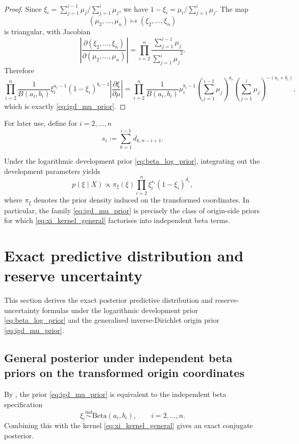 \documentclass[11pt]{article}
\newcommand{\1}{\mathbf{1}}
\newcommand{\BetaD}{\mathrm{Beta}}
\begin{document}
\begin{proof}
Since $\xi_i=\sum_{j=1}^{i-1} \mu_j/\sum_{j=1}^i \mu_j$, we have $1-\xi_i=\mu_i/\sum_{j=1}^i \mu_j$. The map
\[
(\mu_2,\dots,\mu_n)\mapsto(\xi_2,\dots,\xi_n)
\]
is triangular, with Jacobian
\[
\left|\frac{\partial(\xi_2,\dots,\xi_n)}{\partial(\mu_2,\dots,\mu_n)}\right|
=
\prod_{i=2}^n \frac{\sum_{j=1}^{i-1} \mu_j}{{\sum_{j=1}^i \mu_j}^2}.
\]
Therefore
\[
\prod_{i=2}^n
\frac{1}{B(a_i,b_i)}
\xi_i^{a_i-1}(1-\xi_i)^{b_i-1} 
\left|\frac{\partial \xi}{\partial \mu}\right|
=
\prod_{i=2}^{n}
\frac{1}{B(a_i,b_i)}
\mu_i^{b_i-1}
\left(\sum_{j=1}^{i-1} \mu_j\right)^{a_i}
\left(\sum_{j=1}^i \mu_j\right)^{-(a_i+b_i)},
\]
which is exactly \eqref{eq:igd_mu_prior}.
\end{proof}


For later use, define for $i=2,\dots,n$
\begin{equation}
s_i:=\sum_{k=1}^{i-1} d_{k,n-i+1}.
\label{eq:Si_def}
\end{equation}


Under the logarithmic development prior \eqref{eq:beta_log_prior}, integrating out the development parameters yields
\begin{equation}
p(\xi\mid X)
\propto
\pi_\xi(\xi)
\prod_{i=2}^{n} \xi_i^{s_i}(1-\xi_i)^{d_i},
\label{eq:xi_kernel_general}
\end{equation}
where $\pi_\xi$ denotes the prior density induced on the transformed coordinates. In particular, the family \eqref{eq:igd_mu_prior} is precisely the class of origin-side priors for which \eqref{eq:xi_kernel_general} factorises into independent beta terms.

\section{Exact predictive distribution and reserve uncertainty}\label{sec:predictive}

This section derives the exact posterior predictive distribution and 
reserve-uncertainty formulas under the logarithmic development prior \eqref{eq:beta_log_prior} and the generalised inverse-Dirichlet origin prior \eqref{eq:igd_mu_prior}.


\subsection{General posterior under independent beta priors on the transformed origin coordinates}

By , the prior \eqref{eq:igd_mu_prior} is equivalent to the independent beta specification
\[
\xi_i \stackrel{\mathrm{ind}}{\sim} \BetaD(a_i,b_i),
\qquad i=2,\dots,n.
\]
Combining this with the kernel \eqref{eq:xi_kernel_general} gives an exact conjugate posterior.
\end{document}
